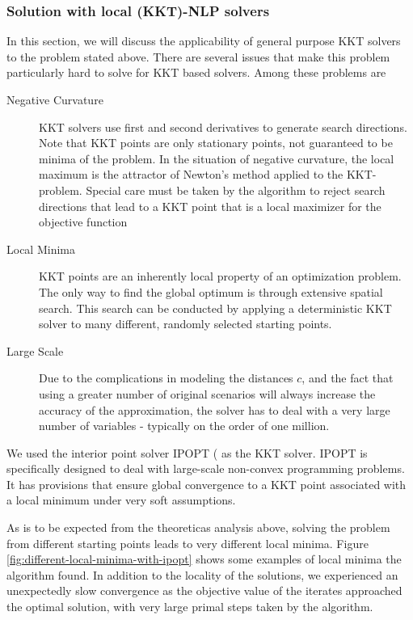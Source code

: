 \subsubsection{Solution with local (KKT)-NLP solvers}
In this section, we will discuss the applicability of general purpose KKT solvers to the problem stated above. There are several issues that make this problem particularly hard to solve for KKT based solvers. Among these problems are
\begin{description}
\item[Negative Curvature] KKT solvers use first and second derivatives to generate search directions. Note that KKT points are only stationary points, not guaranteed to be minima of the problem. In the situation of negative curvature, the local maximum is the attractor of Newton's method applied to the KKT-problem. Special care must be taken by the algorithm to reject search directions that lead to a KKT point that is a local maximizer for the objective function
\item[Local Minima] KKT points are an inherently local property of an optimization problem. The only way to find the global optimum is through extensive spatial search. This search can be conducted by applying a deterministic KKT solver to many different, randomly selected starting points.
\item[Large Scale] Due to the complications in modeling the distances $c$, and the fact that using a greater number of original scenarios will always increase the accuracy of the approximation, the solver has to deal with a very large number of variables - typically on the order of one million.
\end{description}
We used the interior point solver IPOPT (\cite{IpoptImplementation2006} as the KKT solver. IPOPT is specifically designed to deal with large-scale non-convex programming problems. It has provisions that ensure global convergence to a KKT point associated with a local minimum under very soft assumptions.

As is to be expected from the theoreticas analysis above, solving the problem from different starting points leads to very different local minima. Figure \ref{fig:different-local-minima-with-ipopt} shows some examples of local minima the algorithm found. In addition to the locality of the solutions, we experienced an unexpectedly slow convergence as the objective value of the iterates approached the optimal solution, with very large primal steps taken by the algorithm. 

